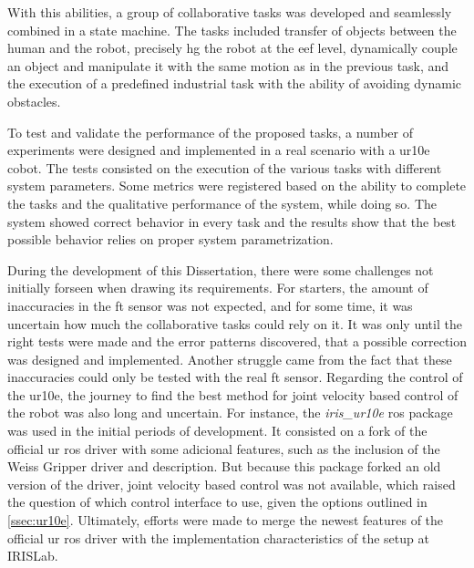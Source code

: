 \par With this abilities, a group of collaborative tasks was developed and seamlessly combined in a state machine. The tasks included transfer of objects between the human and the robot, precisely \ac{hg} the robot at the \ac{eef} level, dynamically couple an object and manipulate it with the same motion as in the previous task, and the execution of a predefined industrial task with the ability of avoiding dynamic obstacles.

\par To test and validate the performance of the proposed tasks, a number of experiments were designed and implemented in a real scenario with a \ac{ur10e} cobot. The tests consisted on the execution of the various tasks with different system parameters. Some metrics were registered based on the ability to complete the tasks and the qualitative performance of the system, while doing so. The system showed correct behavior in every task and the results show that the best possible behavior relies on proper system parametrization.

\par During the development of this Dissertation, there were some challenges not initially forseen when drawing its requirements. For starters, the amount of inaccuracies in the \ac{ft} sensor was not expected, and for some time, it was uncertain how much the collaborative tasks could rely on it. It was only until the right tests were made and the error patterns discovered, that a possible correction was designed and implemented. Another struggle came from the fact that these inaccuracies could only be tested with the real \ac{ft} sensor. Regarding the control of the \ac{ur10e}, the journey to find the best method for joint velocity based control of the robot was also long and uncertain. For instance, the \textit{iris\_ur10e} \ac{ros} package was used in the initial periods of development. It consisted on a fork of the official \ac{ur} \ac{ros} driver with some adicional features, such as the inclusion of the Weiss Gripper driver and description. But because this package forked an old version of the driver, joint velocity based control was not available, which raised the question of which control interface to use, given the options outlined in \autoref{ssec:ur10e}. Ultimately, efforts were made to merge the newest features of the official \ac{ur} \ac{ros} driver with the implementation characteristics of the setup at IRISLab.

